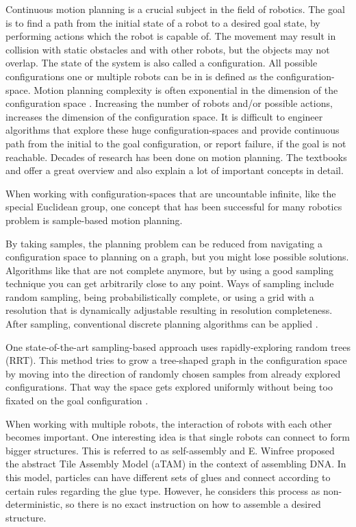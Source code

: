 Continuous motion planning is a crucial subject in the field of robotics.
The goal is to find a path from the initial state of a robot to a desired goal state, by performing actions which the robot is capable of.
The movement may result in collision with static obstacles and with other robots, but the objects may not overlap.
The state of the system is also called a configuration.
All possible configurations one or multiple robots can be in is defined as the configuration-space.
Motion planning complexity is often exponential in the dimension of the configuration space \cite{LaValle2006}.
Increasing the number of robots and/or possible actions, increases the dimension of the configuration space.
It is difficult to engineer algorithms that explore these huge configuration-spaces and provide continuous path from the initial to the goal configuration, or report failure, if the goal is not reachable.
Decades of research has been done on motion planning.
The textbooks \cite{LaValle2006} and \cite{Mueller2019} offer a great overview and also explain a lot of important concepts in detail.

When working with configuration-spaces that are uncountable infinite, like the special Euclidean group, one concept that has been successful for many robotics problem is sample-based motion planning.

By taking samples, the planning problem can be reduced from navigating a configuration space to planning on a graph, but you might lose possible solutions.
Algorithms like that are not complete anymore, but by using a good sampling technique you can get arbitrarily close to any point.
Ways of sampling include random sampling, being probabilistically complete, or using a grid with a resolution that is dynamically adjustable resulting in resolution completeness.
After sampling, conventional discrete planning algorithms can be applied \cite{LaValle2006}.

One state-of-the-art sampling-based approach uses rapidly-exploring random trees (RRT).
This method tries to grow a tree-shaped graph in the configuration space by moving into the direction of randomly chosen samples from already explored configurations. That way the space gets explored uniformly without being too fixated on the goal configuration \cite{lavalle1998,lavalle2001}.

When working with multiple robots, the interaction of robots with each other becomes important.
One interesting idea is that single robots can connect to form bigger structures.
This is referred to as self-assembly and E. Winfree \cite{winfree1998} proposed the abstract Tile Assembly Model (aTAM) in the context of assembling DNA.
In this model, particles can have different sets of glues and connect according to certain rules regarding the glue type.
However, he considers this process as non-deterministic, so there is no exact instruction on how to assemble a desired structure.

